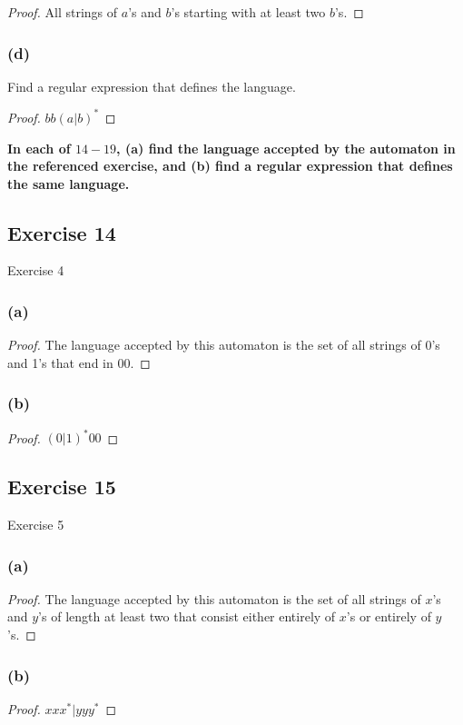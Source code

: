 \documentclass[14pt]{extarticle}
\newcommand{\cy}{\color{cyan}}
\begin{document}
\begin{proof}
    All strings of \(a\)'s and \(b\)'s starting with at least two \(b\)'s.
\end{proof}

\subsubsection{(d)}
Find a regular expression that defines the language.

\begin{proof}
    \(bb(a|b)^*\)
\end{proof}

{\bf \cy In each of \(14-19\), (a) find the language accepted by the automaton in the referenced exercise, and (b) find a
regular expression that defines the same language.}

\subsection{Exercise 14}
Exercise 4

\subsubsection{(a)}
\begin{proof}
    The language accepted by this automaton is the set of all strings of 0’s and 1’s that end in 00.
\end{proof}

\subsubsection{(b)}
\begin{proof}
    \((0 | 1)^*00\)
\end{proof}

\subsection{Exercise 15}
Exercise 5
\subsubsection{(a)}
\begin{proof}
    The language accepted by this automaton is the set of all strings of \(x\)’s and \(y\)’s of length at least two that
    consist either entirely of \(x\)’s or entirely of \(y\)’s.
\end{proof}

\subsubsection{(b)}
\begin{proof}
    \(xxx^* | yyy^*\)
\end{proof}
\end{document}
